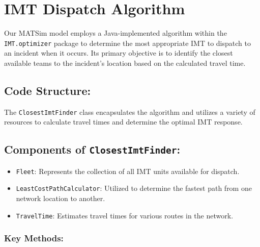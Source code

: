\documentclass[fancy, oneside, mastersfancy, ms]{byuthesis}
\providecommand{\tightlist}{%
  \setlength{\itemsep}{0pt}\setlength{\parskip}{0pt}}\usepackage{longtable,booktabs,array}
\begin{document}
\hypertarget{sec-imt_dispatch}{%
\chapter{IMT Dispatch Algorithm}\label{sec-imt_dispatch}}

Our MATSim model employs a Java-implemented algorithm within the
\texttt{IMT.optimizer} package to determine the most appropriate IMT to
dispatch to an incident when it occurs. Its primary objective is to
identify the closest available teams to the incident's location based on
the calculated travel time.

\hypertarget{code-structure}{%
\section{Code Structure:}\label{code-structure}}

The \texttt{ClosestImtFinder} class encapsulates the algorithm and
utilizes a variety of resources to calculate travel times and determine
the optimal IMT response.

\hypertarget{components-of-closestimtfinder}{%
\section{\texorpdfstring{Components of
\texttt{ClosestImtFinder}:}{Components of ClosestImtFinder:}}\label{components-of-closestimtfinder}}

\begin{itemize}
\tightlist
\item
  \texttt{Fleet}: Represents the collection of all IMT units available
  for dispatch.
\item
  \texttt{LeastCostPathCalculator}: Utilized to determine the fastest
  path from one network location to another.
\item
  \texttt{TravelTime}: Estimates travel times for various routes in the
  network.
\end{itemize}

\hypertarget{key-methods}{%
\subsection{Key Methods:}\label{key-methods}}
\end{document}
